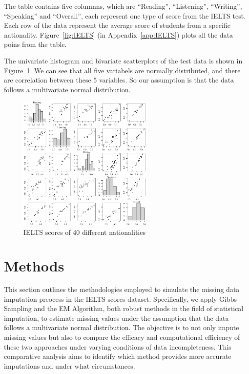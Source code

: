 \documentclass[12pt]{article}
\begin{document}
The table contains five columnns, which are ``Reading'', ``Listening'', ``Writing'', ``Speaking'' and ``Overall'', each represent one type of score from the IELTS test. Each row of the data represent the average score of students from a specific nationality. Figure~\ref{fig:IELTS} (in Appendix~\ref{app:IELTS}) plots all the data poins from the table.

The univariate histogram and bivariate scatterplots of the test data is shown in Figure~\ref{fig:stats}. We can see that all five variabels are normally distributed, and there are correlation between these 5 variables. So our assumption is that the data follows a multivariate normal distribution.

\begin{figure}[htpb]
	\centering
	\includegraphics[width=0.6\textwidth]{pic/stat.pdf}
	\caption{IELTS scores of 40 different nationalities}
	\label{fig:stats}
\end{figure}

\section{Methods}

This section outlines the methodologies employed to simulate the missing data imputation preocess in the IELTS scores dataset. Specifically, we apply Gibbs Sampling and the EM Algorithm, both robust methods in the field of statistical imputation, to estimate missing values under the assumption that the data follows a multivariate normal distribution. The objective is to not only impute missing values but also to compare the efficacy and computational efficiency of these two approaches under varying conditions of data incompleteness. This comparative analysis aims to identify which method provides more accurate imputations and under what circumstances.
\end{document}
